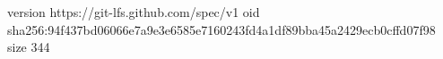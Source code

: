 version https://git-lfs.github.com/spec/v1
oid sha256:94f437bd06066e7a9e3e6585e7160243fd4a1df89bba45a2429ecb0cffd07f98
size 344
